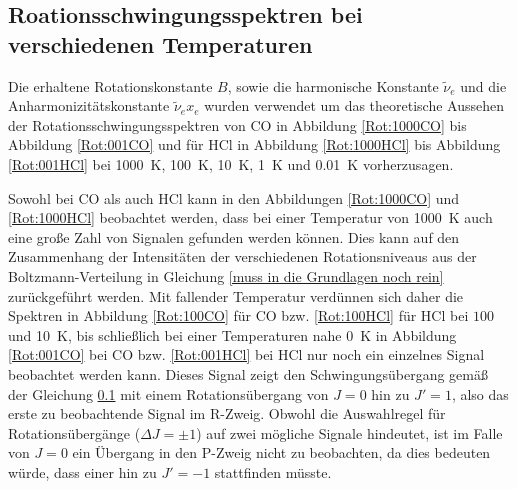\subsection{Roationsschwingungsspektren bei verschiedenen Temperaturen}


Die erhaltene Rotationskonstante $B$, sowie die harmonische Konstante $\tilde{\nu}_e$ und die Anharmonizitätskonstante $\tilde{\nu}_e x_e$ wurden verwendet um das theoretische Aussehen der Rotationsschwingungsspektren von CO in Abbildung \ref{Rot:1000CO} bis Abbildung \ref{Rot:001CO} und für HCl in Abbildung \ref{Rot:1000HCl} bis Abbildung \ref{Rot:001HCl} bei \SI[mode=math]{1000}{K}, \SI[mode=math]{100}{K}, \SI[mode=math]{10}{K}, \SI[mode=math]{1}{K} und \SI[mode=math]{0.01}{K} vorherzusagen.

Sowohl bei CO als auch HCl kann in den Abbildungen \ref{Rot:1000CO} und \ref{Rot:1000HCl} beobachtet werden, dass bei einer Temperatur von \SI[mode=math]{1000}{K} auch eine große Zahl von Signalen gefunden werden können. Dies kann auf den Zusammenhang der Intensitäten der verschiedenen Rotationsniveaus aus der Boltzmann-Verteilung in Gleichung \ref{muss in die Grundlagen noch rein} zurückgeführt werden. Mit fallender Temperatur verdünnen sich daher die Spektren in Abbildung \ref{Rot:100CO} für CO bzw. \ref{Rot:100HCl} für HCl bei $100$ und \SI[mode=math]{10}{K}, bis schließlich bei einer Temperaturen nahe \SI[mode=math]{0}{K} in Abbildung \ref{Rot:001CO} bei CO bzw. \ref{Rot:001HCl} bei HCl nur noch ein einzelnes Signal beobachtet werden kann. Dieses Signal zeigt den Schwingungsübergang gemäß der Gleichung \ref{}  mit einem Rotationsübergang von $J=0$ hin zu $J'=1$, also das erste zu beobachtende Signal im R-Zweig. Obwohl die Auswahlregel für Rotationsübergänge (\(\Delta J = \pm 1\)) auf zwei mögliche Signale hindeutet, ist im Falle von $J=0$ ein Übergang in den P-Zweig nicht zu beobachten, da dies bedeuten würde, dass einer  hin zu $J'=-1$ stattfinden müsste.

